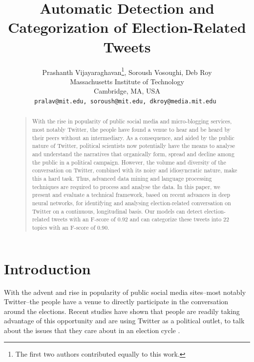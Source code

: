 \documentclass[letterpaper]{article}
\begin{document}
\title{Automatic Detection and Categorization of Election-Related Tweets}
\author{Prashanth Vijayaraghavan\thanks{The first two authors contributed equally to this work.}, Soroush Vosoughi\footnotemark[1], Deb Roy \\ Massachusetts Institute of Technology \\ Cambridge, MA, USA \\ \tt{pralav@mit.edu, soroush@mit.edu, dkroy@media.mit.edu} }
\maketitle
\begin{abstract}
\begin{quote}
With the rise in popularity of public social media and micro-blogging services, most notably Twitter, the people have found a venue to hear and be heard by their peers without an intermediary. As a consequence, and aided by the public nature of Twitter, political scientists now potentially have the means to analyse and understand the narratives that organically form, spread and decline among the public in a political campaign.
However, the volume and diversity of the conversation on Twitter, combined with its noisy and idiosyncratic nature, make this a hard task. Thus, advanced data mining and language processing techniques are required to process and analyse the data. In this paper, we present and evaluate a technical framework, based on recent advances in deep neural networks, for identifying and analysing election-related conversation on Twitter on a continuous, longitudinal basis. Our models can detect election-related tweets with an F-score of 0.92 and can categorize these tweets into 22 topics with an F-score of 0.90. %
\end{quote}
\end{abstract}

\linespread{.97}
\setlength{\belowcaptionskip}{-6pt}



\section{Introduction}
With the advent and rise in popularity of public social media sites--most notably Twitter--the people have a venue to directly participate in the conversation around the elections. Recent studies have shown that people are readily taking advantage of this opportunity and are using Twitter as a political outlet, to talk about the issues that they care about in an election cycle \cite{twitter_elec}.
\end{document}
